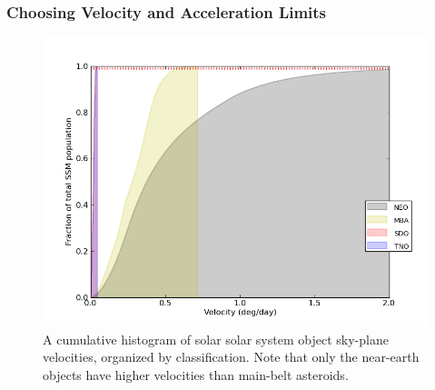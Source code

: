 \subsubsection{Choosing Velocity and Acceleration Limits}
\label{velAccLimits}
\begin{figure}[ht!]
  \centering
  \includegraphics[width=13cm]{illustrations/mopsplots/aug2011/n_velocity.png}
  \caption{A cumulative histogram of solar solar system object
    sky-plane velocities, organized by classification.  Note that only
    the near-earth objects have higher velocities than main-belt
    asteroids.}
  \label{velSurvey}
\end{figure}

